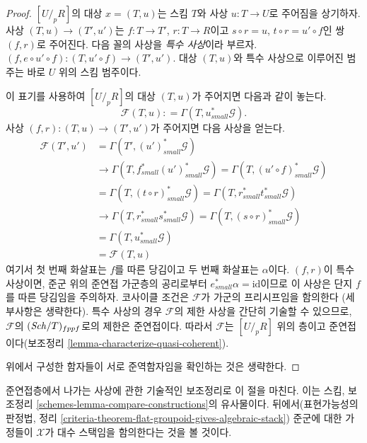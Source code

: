 \begin{proof}
\medskip\noindent
$[U/_{\!p}R]$의 대상 $x = (T, u)$는 스킴 $T$와 사상
$u : T \to U$로 주어짐을 상기하자. 사상
$(T, u) \to (T', u')$는 $f : T \to T'$, $r : T \to R$이고
$s \circ r = u$, $t \circ r = u' \circ f$인 쌍 $(f, r)$로 주어진다.
다음 꼴의 사상을 {\it 특수 사상}이라 부르자.
$(f, e \circ u' \circ f) : (T, u' \circ f) \to (T', u')$.
대상 $(T, u)$와 특수 사상으로 이루어진 범주는 바로
$U$ 위의 스킴 범주이다.

\medskip\noindent
이 표기를 사용하여 $[U/_{\!p}R]$의 대상 $(T, u)$가 주어지면 다음과 같이 놓는다.
$$
\mathcal{F}(T, u) : = \Gamma(T, u_{small}^*\mathcal{G}).
$$
사상 $(f, r) : (T, u) \to (T', u')$가 주어지면 다음 사상을 얻는다.
\begin{align*}
\mathcal{F}(T', u') & = \Gamma(T', (u')_{small}^*\mathcal{G}) \\
& \to \Gamma(T, f_{small}^*(u')_{small}^*\mathcal{G}) =
\Gamma(T, (u' \circ f)_{small}^*\mathcal{G}) \\
& = \Gamma(T, (t \circ r)_{small}^*\mathcal{G}) =
\Gamma(T, r_{small}^*t_{small}^*\mathcal{G}) \\
& \to \Gamma(T, r_{small}^*s_{small}^*\mathcal{G}) =
\Gamma(T, (s \circ r)_{small}^*\mathcal{G}) \\
& = \Gamma(T, u_{small}^*\mathcal{G}) \\
& = \mathcal{F}(T, u)
\end{align*}
여기서 첫 번째 화살표는 $f$를 따른 당김이고 두 번째 화살표는
$\alpha$이다. $(f, r)$이 특수 사상이면, 준군 위의 준연접 가군층의
공리로부터 $e_{small}^*\alpha = \text{id}$이므로 이 사상은 단지
$f$를 따른 당김임을 주의하자.
코사이클 조건은 $\mathcal{F}$가 가군의 프리시프임을 함의한다
(세부사항은 생략한다). 특수 사상의 경우 $\mathcal{F}$의 제한 사상을
간단히 기술할 수 있으므로, $\mathcal{F}$의 $(\mathit{Sch}/T)_{fppf}$로의
제한은 준연접이다. 따라서 $\mathcal{F}$는 $[U/_{\!p}R]$ 위의
층이고 준연접이다(보조정리 \ref{lemma-characterize-quasi-coherent}).

\medskip\noindent
위에서 구성한 함자들이 서로 준역함자임을 확인하는 것은 생략한다.
\end{proof}

\noindent
준연접층에서 나가는 사상에 관한 기술적인 보조정리로 이 절을 마친다.
이는 스킴, 보조정리 \ref{schemes-lemma-compare-constructions}의
유사물이다. 뒤에서(표현가능성의 판정법, 정리
\ref{criteria-theorem-flat-groupoid-gives-algebraic-stack}) 준군에 대한
가정들이 $\mathcal{X}$가 대수 스택임을 함의한다는 것을 볼 것이다.

